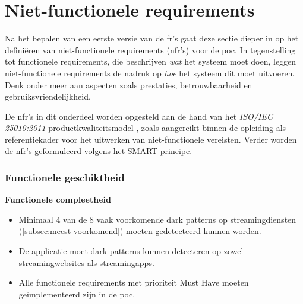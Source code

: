 \newpage

\section{Niet-functionele requirements}
\label{sec:nfr}

\vspace{1em}

Na het bepalen van een eerste versie van de \acrshort{fr}'s gaat deze sectie dieper in op het definiëren van niet-functionele requirements (\acrshort{nfr}'s) voor de \acrshort{poc}. In tegenstelling tot functionele requirements, die beschrijven \textit{wat} het systeem moet doen, leggen niet-functionele requirements de nadruk op \textit{hoe} het systeem dit moet uitvoeren. Denk onder meer aan aspecten zoals prestaties, betrouwbaarheid en gebruiksvriendelijkheid. 

\vspace{1em}

De \acrshort{nfr}'s in dit onderdeel worden opgesteld aan de hand van het \textit{ISO/IEC 25010:2011} productkwaliteitsmodel \autocite{ISO25010_2011}, zoals aangereikt binnen de opleiding als referentiekader voor het uitwerken van niet-functionele vereisten.
Verder worden de \acrshort{nfr}'s geformuleerd volgens het SMART-principe.

\vspace{1em}

\subsubsection{Functionele geschiktheid}
\vspace{1em}

\hspace*{1.5em}\textbf{Functionele compleetheid}

\begin{itemize}
    \item Minimaal 4 van de 8 vaak voorkomende dark patterns op streamingdiensten (\ref{subsec:meest-voorkomend}) moeten gedetecteerd kunnen worden.
    \item De applicatie moet dark patterns kunnen detecteren op zowel streamingwebsites als streamingapps.
    \item Alle functionele requirements met prioriteit Must Have moeten geïmplementeerd zijn in de \acrshort{poc}.
\end{itemize}

\vspace{0.5em}

